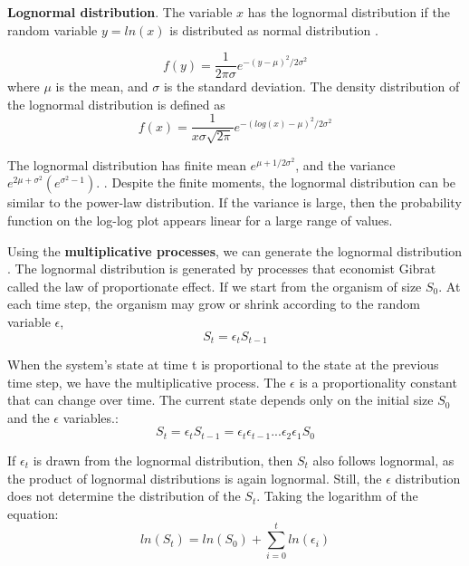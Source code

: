 \textbf{Lognormal distribution}. The variable $x$ has the lognormal distribution if the random variable $y=ln(x)$ is distributed as normal distribution \cite{limpert2001log}. 

\begin{equation}
f(y) = \frac{1}{2\pi\sigma}e^{-(y-\mu)^2/2\sigma^2}
\end{equation}
where $\mu$ is the mean, and $\sigma$ is the standard deviation. The density distribution of the lognormal distribution is defined as
\begin{equation}
f(x) = \frac{1}{x \sigma \sqrt{2\pi}}e^{-(log(x)-\mu)^2 /2\sigma^2} 
\end{equation}

The lognormal distribution has finite mean $e^{\mu+1/2\sigma^2}$, and the variance $e^{2\mu+\sigma^2}(e^{\sigma^2 -1})$.  \cite{mitzenmacher2004brief}. Despite the finite moments, the lognormal distribution can be similar to the power-law distribution. If the variance is large, then the probability function on the log-log plot appears linear for a large range of values. 

Using the \textbf{multiplicative processes}, we can generate the lognormal distribution \cite{caldarelli2007scalefree, mitzenmacher2004brief}. The lognormal distribution is generated by processes that economist Gibrat called the law of proportionate effect. If we start from the organism of size $S_0$. At each time step, the organism may grow or shrink according to the random variable $\epsilon$, 
\begin{equation}
S_t = \epsilon_t S_{t-1}
\end{equation}

When the system's state at time t is proportional to the state at the previous time step, we have the multiplicative process. The $\epsilon$ is a proportionality constant that can change over time. The current state depends only on the initial size $S_0$ and the $\epsilon$ variables.:
\begin{equation}
S_t = \epsilon_t S_{t-1} = \epsilon_t \epsilon_{t-1}... \epsilon_2 \epsilon_1 S_{0}
\end{equation}

If $\epsilon_t$ is drawn from the lognormal distribution, then $S_t$ also follows lognormal, as the product of lognormal distributions is again lognormal. Still, the $\epsilon$ distribution does not determine the distribution of the $S_t$. Taking the logarithm of the equation:
\begin{equation}
ln(S_t) = ln(S_0) + \sum_{i=0}^{t} ln(\epsilon_i)
\end{equation}

